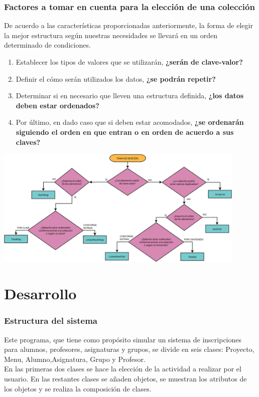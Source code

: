 \documentclass[12pt]{report}
\begin{document}
\subsubsection{Factores a tomar en cuenta para la elección de una colección}
De acuerdo a las características proporcionadas anteriormente, la forma de elegir la mejor estructura según nuestras necesidades se llevará en un orden determinado de condiciones.
\begin{enumerate}
    \item Establecer los tipos de valores que se utilizarán, \textbf{¿serán de clave-valor?}
    \item Definir el cómo serán utilizados los datos, \textbf{¿se podrán repetir?}
    \item Determinar si en necesario que lleven una estructura definida, \textbf{¿los datos deben estar ordenados?}
    \item Por último, en dado caso que si deben estar acomodados, \textbf{¿se ordenarán siguiendo el orden en que entran o en orden de acuerdo a sus claves?}
\end{enumerate}

\begin{center}
    \includegraphics[width=0.9\textwidth]{img/Elección de una colección.png}
\end{center}



\section*{Desarrollo}

\subsubsection{Estructura del sistema}
Este programa, que tiene como propósito simular un sistema de inscripciones para alumnos, profesores, asignaturas y grupos, se divide en seis clases: Proyecto, Menu, Alumno,Asignatura, Grupo y Profesor.\\
En las primeras dos clases se hace la elección de la actividad a realizar por el usuario. En las restantes clases se añaden objetos, se muestran los atributos de los objetos y se realiza la composición de clases.
\end{document}
